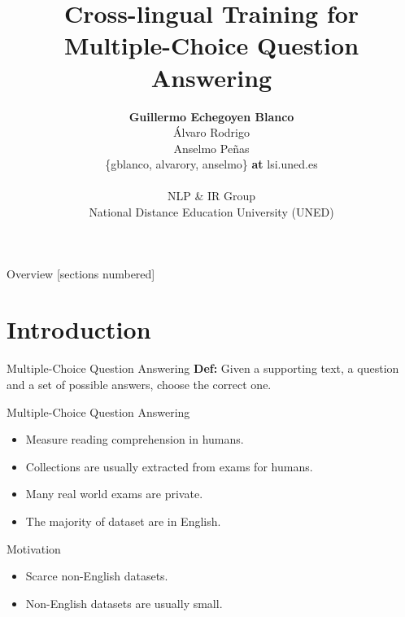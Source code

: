 \documentclass[]{beamer}
\title{Cross-lingual Training for\\Multiple-Choice Question Answering}
\author{\textbf{Guillermo Echegoyen Blanco} \\ \'Alvaro Rodrigo \\ Anselmo Pe\~nas \\ 
    \{gblanco, alvarory, anselmo\} \textbf{at} lsi.uned.es \\ \\
    NLP \& IR Group \\
    National Distance Education University (UNED)}
\date{}
\def\mAlertSpace{\vspace{0.5em}}
\begin{document}
\maketitle

\begin{frame}{Overview}
  [sections numbered]
  \tableofcontents[hideallsubsections]
\end{frame}

\section{Introduction}
  \begin{frame}{\secname}
    \begin{alertblock}{Multiple-Choice Question Answering}
      \mAlertSpace
      \textbf{Def:} Given a supporting text, a question and a set of possible answers, choose the correct one. 
      \mAlertSpace
      
    \end{alertblock}
  \end{frame}
  \begin{frame}{\secname}
    \begin{alertblock}{Multiple-Choice Question Answering}
      \mAlertSpace
      \begin{itemize}
        \item Measure reading comprehension in humans.
        \item Collections are usually extracted from exams for humans.
        \item Many real world exams are private.
        \item The majority of dataset are in English.
    \end{itemize}
    \end{alertblock}
  \end{frame}


  \begin{frame}{\secname}
    \begin{alertblock}{Motivation}
      \begin{itemize}
        \item Scarce non-English datasets.
        \item Non-English datasets are usually small.
      \end{itemize}
    \end{alertblock}
  \end{frame}
  
\end{document}
